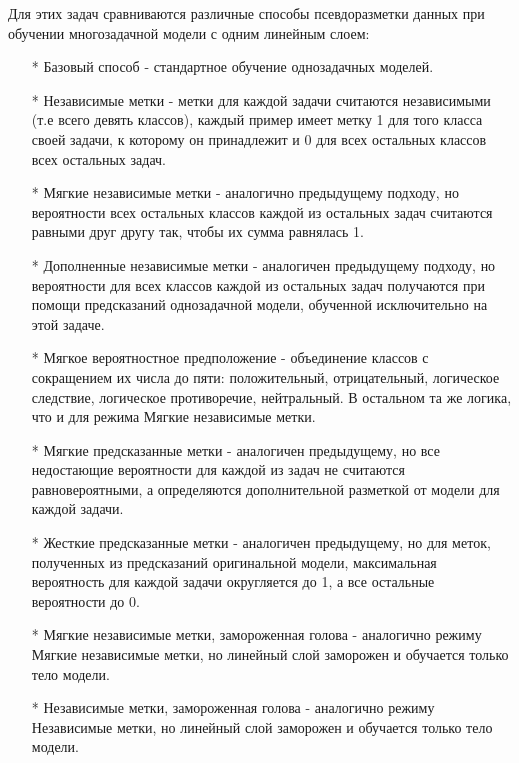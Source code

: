 Для этих задач сравниваются различные способы псевдоразметки данных при обучении многозадачной модели с одним линейным слоем:
\begin{enumerate}
\item[*] Базовый способ - стандартное обучение однозадачных моделей.
\item[*] Независимые метки - метки для каждой задачи считаются независимыми (т.е всего девять классов), каждый пример имеет метку 1 для того класса своей задачи, к которому он принадлежит и 0 для всех остальных классов всех остальных задач. 
\item[*] Мягкие независимые метки - аналогично предыдущему подходу, но вероятности всех остальных классов каждой из остальных задач считаются равными друг другу так, чтобы их сумма равнялась 1. 
\item[*] Дополненные независимые метки - аналогичен предыдущему подходу, но вероятности для всех классов каждой из остальных задач получаются при помощи предсказаний однозадачной модели, обученной исключительно на этой задаче.
\item[*] Мягкое вероятностное предположение - объединение классов с сокращением их числа до пяти: положительный, отрицательный, логическое следствие, логическое противоречие, нейтральный. В остальном та же логика, что и для режима Мягкие независимые метки.
\item[*] Мягкие предсказанные метки - аналогичен предыдущему, но все недостающие вероятности для каждой из задач не считаются равновероятными, а определяются дополнительной разметкой от модели для каждой задачи. 
\item[*] Жесткие предсказанные метки - аналогичен предыдущему, но для меток, полученных из предсказаний оригинальной модели, максимальная вероятность для каждой задачи округляется до 1, а все остальные вероятности до 0.
\item[*] Мягкие независимые метки, замороженная голова - аналогично режиму Мягкие независимые метки, но линейный слой заморожен и обучается только тело модели.
\item[*] Независимые метки, замороженная голова - аналогично режиму Независимые метки, но линейный слой заморожен и обучается только тело модели.
\end{enumerate}

